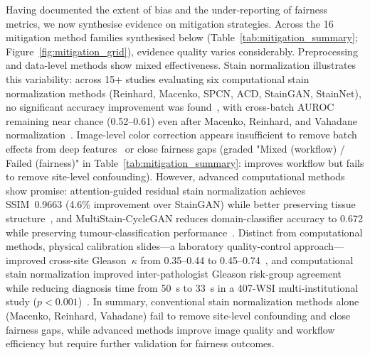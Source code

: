 \label{sec:results:mit:stain}%
\label{sec:results:mit:augmentation}%
Having documented the extent of bias and the under-reporting of fairness metrics, we now synthesise evidence on mitigation strategies. Across the 16 mitigation method families synthesised below
(Table~\ref{tab:mitigation_summary}; Figure~\ref{fig:mitigation_grid}),
evidence quality varies considerably. Preprocessing and data-level methods show mixed effectiveness. Stain normalization illustrates this variability: across 15+ studies evaluating six computational stain normalization methods (Reinhard, Macenko, SPCN, ACD, StainGAN, StainNet), no significant accuracy improvement was found~\citep{voon2023evaluating}, with cross-batch AUROC remaining near chance (0.52--0.61) even after Macenko, Reinhard, and Vahadane normalization~\citep{komen2024batch, lin2025stain}. Image-level color correction appears insufficient to remove batch effects from deep features~\citep{komen2024batch} or close fairness gaps (graded "Mixed (workflow) / Failed (fairness)" in Table~\ref{tab:mitigation_summary}: improves workflow but fails to remove site-level confounding). However, advanced computational methods show promise: attention-guided residual stain normalization achieves SSIM~0.9663 (4.6\% improvement over StainGAN) while better preserving tissue structure~\citep{madusanka2025structure}, and MultiStain-CycleGAN reduces domain-classifier accuracy to 0.672 while preserving tumour-classification performance~\citep{hetz2024multi}. Distinct from computational methods, physical calibration slides---a laboratory quality-control approach---improved cross-site Gleason~$\kappa$ from 0.35--0.44 to 0.45--0.74~\citep{ji2025physical}, and computational stain normalization improved inter-pathologist Gleason risk-group agreement while reducing diagnosis time from 50~s to 33~s in a 407-WSI multi-institutional study ($p < 0.001$)~\citep{cazaniga2024not}. In summary, conventional stain normalization methods alone (Macenko, Reinhard, Vahadane) fail to remove site-level confounding and close fairness gaps, while advanced methods improve image quality and workflow efficiency but require further validation for fairness outcomes.

